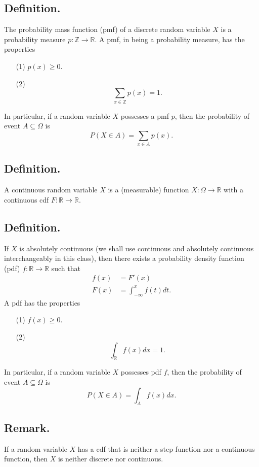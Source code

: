\documentclass[titlepage]{article}
\begin{document}
\subsection{Definition.} The probability mass function (pmf) of a discrete random variable $X$ is a probability measure $p: \mathbb{Z} \to \mathbb{R}$. A pmf, in being a probability measure, has the properties 
\begin{enumerate}
\item[(1)] $p(x) \geq 0$.
\item[(2)]
$$\sum_{x \in \mathbb{Z}}p(x) = 1.$$
\end{enumerate}
In particular, if a random variable $X$ possesses a pmf $p$, then the probability of event $A \subseteq \Omega$ is
$$P(X \in A) = \sum_{x \in A}p(x).$$

\subsection{Definition.} A continuous random variable $X$ is a (measurable) function $X: \Omega \to \mathbb{R}$ with a continuous cdf $F: \mathbb{R} \to \mathbb{R}$.

\subsection{Definition.} If $X$ is absolutely continuous (we shall use continuous and absolutely continuous interchangeably in this class), then there exists a probability density function (pdf) $f: \mathbb{R} \to \mathbb{R}$ such that 
\begin{align*}
    f(x) &= F'(x) \\
    F(x) &= \int_{-\infty}^{x}f(t)dt.
\end{align*}
A pdf has the properties 
\begin{enumerate}
\item[(1)] $f(x) \geq 0$.
\item[(2)] 
$$\int_{\mathbb{R}}f(x)dx = 1.$$
\end{enumerate}
In particular, if a random variable $X$ possesses pdf $f$, then the probability of event $A \subseteq \Omega$ is 
$$P(X \in A) = \int_{A}f(x)dx.$$

\subsection{Remark.} If a random variable $X$ has a cdf that is neither a step function nor a continuous function, then $X$ is neither discrete nor continuous.
\end{document}
